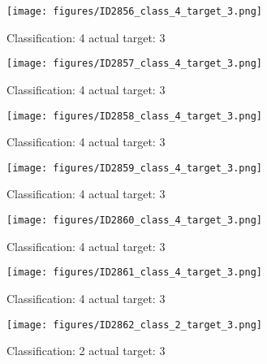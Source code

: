 \begin{figure}[h!]
\begin{center}
\texttt{[image: figures/ID2856\_class\_4\_target\_3.png]}
\end{center}
\caption{ Classification: 4 actual target: 3}
\label{fig:ID2856_class_4_target_3}
\end{figure}
\begin{figure}[h!]
\begin{center}
\texttt{[image: figures/ID2857\_class\_4\_target\_3.png]}
\end{center}
\caption{ Classification: 4 actual target: 3}
\label{fig:ID2857_class_4_target_3}
\end{figure}
\begin{figure}[h!]
\begin{center}
\texttt{[image: figures/ID2858\_class\_4\_target\_3.png]}
\end{center}
\caption{ Classification: 4 actual target: 3}
\label{fig:ID2858_class_4_target_3}
\end{figure}
\begin{figure}[h!]
\begin{center}
\texttt{[image: figures/ID2859\_class\_4\_target\_3.png]}
\end{center}
\caption{ Classification: 4 actual target: 3}
\label{fig:ID2859_class_4_target_3}
\end{figure}
\begin{figure}[h!]
\begin{center}
\texttt{[image: figures/ID2860\_class\_4\_target\_3.png]}
\end{center}
\caption{ Classification: 4 actual target: 3}
\label{fig:ID2860_class_4_target_3}
\end{figure}
\begin{figure}[h!]
\begin{center}
\texttt{[image: figures/ID2861\_class\_4\_target\_3.png]}
\end{center}
\caption{ Classification: 4 actual target: 3}
\label{fig:ID2861_class_4_target_3}
\end{figure}
\begin{figure}[h!]
\begin{center}
\texttt{[image: figures/ID2862\_class\_2\_target\_3.png]}
\end{center}
\caption{ Classification: 2 actual target: 3}
\label{fig:ID2862_class_2_target_3}
\end{figure}
